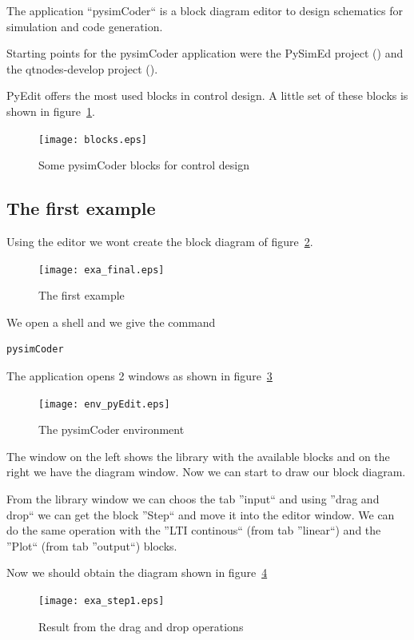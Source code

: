 The application ``pysimCoder`` is a block diagram editor to design schematics for 
simulation and code generation.

Starting points for the pysimCoder application were the PySimEd project 
(\cite{PSE}) and the qtnodes-develop project (\cite{QTNODES}).

PyEdit offers the most used blocks in control design. A little set of these 
blocks is shown in figure~\ref{F17}.
 
 \begin{figure}[htbp]	%
 \centering
 \texttt{[image: blocks.eps]}
 \caption{Some pysimCoder blocks for control design}
 \label{F17}
 \end{figure}
 
 \subsection{The first example}
 Using the editor we wont create the block diagram of figure~\ref{Fig:exa1}.
 
\begin{figure}[htbp]	%
\centering
\texttt{[image: exa\_final.eps]}
\caption{The first example}
\label{Fig:exa1}
\end{figure}

We open a shell and we give the command
 
\begin{verbatim}
pysimCoder
\end{verbatim}

The application opens 2 windows as shown in figure~\ref{Fig:envEdit}

\begin{figure}[htbp]	%
\centering
\texttt{[image: env\_pyEdit.eps]}
\caption{The pysimCoder environment}
\label{Fig:envEdit}
\end{figure}

The window on the left shows the library with the available blocks and on the 
right we have the diagram window. Now we can start to draw our block diagram.

From the library window we can choos the tab ''input`` and using ''drag and 
drop`` we can get the block ''Step`` and move it into the editor window. We can 
do the same operation with the ''LTI continous`` (from tab ''linear``) and the 
''Plot`` (from tab ''output``) blocks.

Now we should obtain the diagram shown in figure~\ref{Fig:exa_step1}

\begin{figure}[htbp]	%
\centering
\texttt{[image: exa\_step1.eps]}
\caption{Result from the drag and drop operations}
\label{Fig:exa_step1}
\end{figure}

